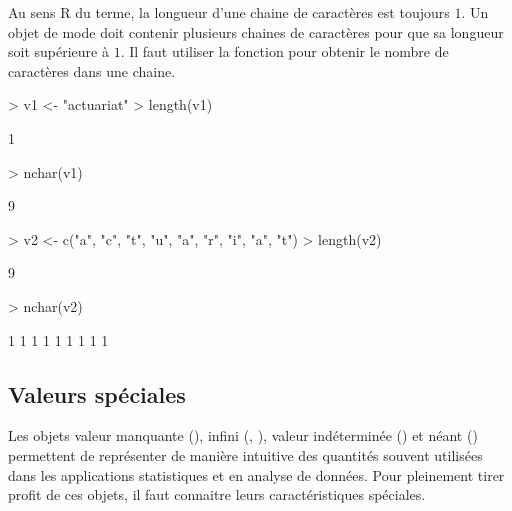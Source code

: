 
Au sens R du terme, la longueur d'une chaine de caractères est
toujours $1$. Un objet de mode  doit contenir
plusieurs chaines de caractères pour que sa longueur soit supérieure à
$1$. Il faut utiliser la fonction  pour obtenir le
nombre de caractères dans une chaine.
\begin{Schunk}
\begin{Sinput}
> v1 <- "actuariat"
> length(v1)
\end{Sinput}
\begin{Soutput}
[1] 1
\end{Soutput}
\begin{Sinput}
> nchar(v1)
\end{Sinput}
\begin{Soutput}
[1] 9
\end{Soutput}
\end{Schunk}
\begin{Schunk}
\begin{Sinput}
> v2 <- c("a", "c", "t", "u", "a", "r", "i", "a", "t")
> length(v2)
\end{Sinput}
\begin{Soutput}
[1] 9
\end{Soutput}
\begin{Sinput}
> nchar(v2)
\end{Sinput}
\begin{Soutput}
[1] 1 1 1 1 1 1 1 1 1
\end{Soutput}
\end{Schunk}

\subsection{Valeurs spéciales}
\label{sec:premiers:objets:NA_et_al}

Les objets valeur manquante (), infini (,
), valeur indéterminée () et néant ()
permettent de représenter de manière intuitive des quantités souvent
utilisées dans les applications statistiques et en analyse de données.
Pour pleinement tirer profit de ces objets, il faut connaitre leurs
caractéristiques spéciales.

